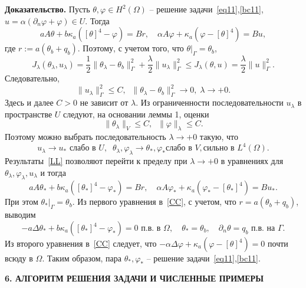 \documentclass[12pt]{article}
\begin{document}
    {\bf Доказательство.}
    Пусть $\theta,\varphi\in H^2(\Omega)$ -- решение задачи~\eqref{eq11},\eqref{bc11},
    $u=\alpha(\partial_n\varphi+\varphi)\in U.$ Тогда
    \[
        a A \theta + b \kappa_a ([\theta]^4 - \varphi ) = Br,\quad
        \alpha A \varphi + \kappa_a (\varphi - [\theta]^4)  = Bu,
    \]
    где $r:=a(\theta_b+q_b).$ Поэтому, с учетом того, что $\theta|_\Gamma=\theta_b$,
    \[
        J_\lambda(\theta_\lambda, u_\lambda) = \frac{1}{2}\|\theta_\lambda -\theta_b\|^2_\Gamma
        + \frac{\lambda}{2}\|u_\lambda\|^2_\Gamma\leq J_\lambda(\theta, u)=\frac{\lambda}{2}\|u\|^2_\Gamma.
    \]
    Следовательно,
    \[
        \|u_\lambda\|^2_\Gamma\leq C,\;\; \|\theta_\lambda -\theta_b\|^2_\Gamma\to 0,\; \lambda\to +0.
    \]
    Здесь и далее $C>0$ не зависит от $\lambda.$
    Из ограниченности последовательности $u_\lambda$ в пространстве $U$ следуют, на основании
    леммы 1, оценки
    \[
        \|\theta_\lambda\|_V \leq C,\;\;
        \|\varphi\|_\lambda \leq C.
    \]
    Поэтому можно выбрать последовательность $\lambda\to+0$ такую, что
    \begin{equation}
        \label{LL}
        u_\lambda \rightarrow u_* \text{  слабо в } U, \;\;
        \theta_\lambda, \varphi_\lambda \rightarrow \theta_*,\varphi_* \text{
            слабо в } V, \text{
            сильно в } L^4(\Omega).
    \end{equation}
    Результаты~\eqref{LL} позволяют перейти к пределу при $\lambda\to+0$
    в уравнениях для $\theta_\lambda,\varphi_\lambda,u_\lambda$ и тогда
    \begin{equation}
        \label{CC}
        a A \theta_* + b \kappa_a ([\theta_*]^4 - \varphi_* ) = Br,\quad
        \alpha A \varphi_* + \kappa_a (\varphi_* - [\theta_*]^4)  = Bu_*.
    \end{equation}
    При этом $\theta_*|_\Gamma=\theta_b.$
    Из первого уравнения в~\eqref{CC}, с учетом, что $r=a(\theta_b+q_b)$,
    выводим
    \[
        - a\Delta\theta_* + b\kappa_a([\theta_*]^4- \varphi_*)=0 \text{ п.в. в }\Omega,
        \quad \theta_*=\theta_b,\quad \partial_n\theta = q_b \text{ п.в. на  }\Gamma.
    \]
    Из второго уравнения в~\eqref{CC} следует, что $-\alpha \Delta \varphi +
    \kappa_a(\varphi-[\theta]^4)=0$ почти всюду в $\Omega.$ Таким образом,
    пара $\theta_*,\varphi_*$ -- решение задачи~\eqref{eq11},\eqref{bc11}.

    \begin{center}
        \textbf{6. АЛГОРИТМ РЕШЕНИЯ ЗАДАЧИ И ЧИСЛЕННЫЕ ПРИМЕРЫ}
    \end{center}
\end{document}
